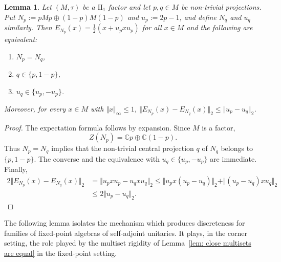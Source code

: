 \documentclass[12pt]{amsart} %
\theoremstyle{plain}
\newtheorem{lemma}[theorem]{Lemma}
\theoremstyle{definition}
\newcommand{\C}{\mathbb{C}}
\begin{document}
\begin{lemma}\label{lem:block-diagonal-comparison}
Let $(M,\tau)$ be a $\mathrm{II}_1$ factor and let $p,q\in M$ be non-trivial
projections. Put $N_p:=pMp\oplus(1-p)M(1-p)$ and $u_p:=2p-1$, and define $N_q$ and $u_q$ similarly. Then
$E_{N_p}(x)=\frac12(x+u_pxu_p)$ for all $x\in M$ and the following are equivalent:
\begin{enumerate}
\item $N_p=N_q$,
\item $q\in\{p,1-p\}$,
\item $u_q\in\{u_p,-u_p\}$.
\end{enumerate}
Moreover, for every $x\in M$ with $\Vert x\Vert_\infty\leq1$, $\Vert E_{N_p}(x)-E_{N_q}(x)\Vert_2
\leq \Vert u_p-u_q\Vert_2$.
\end{lemma}
\begin{proof}
The expectation formula follows by expansion. Since $M$ is a factor,
$$
Z(N_p)=\C p\oplus\C(1-p).
$$
Thus $N_p=N_q$ implies that the non-trivial central projection $q$ of $N_q$
belongs to $\{p,1-p\}$. The converse and the equivalence with
$u_q\in\{u_p,-u_p\}$ are immediate. Finally,
$$
\begin{aligned}
2\Vert E_{N_p}(x)-E_{N_q}(x)\Vert_2
&=\Vert u_pxu_p-u_qxu_q\Vert_2
\leq\Vert u_px(u_p-u_q)\Vert_2
+\Vert(u_p-u_q)xu_q\Vert_2\\
&\leq2\Vert u_p-u_q\Vert_2.
\end{aligned}
$$\end{proof}

\noindent The following lemma isolates the mechanism which produces discreteness
for families of fixed-point algebras of self-adjoint unitaries. It plays, in the
corner setting, the role played by the multiset rigidity of
Lemma~\ref{lem: close multisets are equal} in the fixed-point setting.
\end{document}
